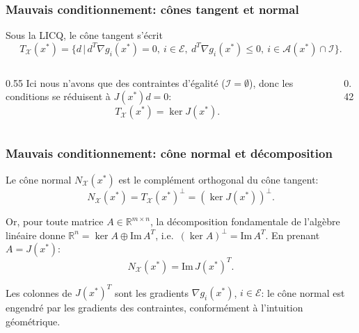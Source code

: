 \documentclass[t,usepdftitle=false,aspectratio=169]{beamer}
\def\cA{\mathcal{A}}
\def\cE{\mathcal{E}}
\def\cI{\mathcal{I}}
\def\cX{\mathcal{X}}
\def\RR{\mathbb{R}}
\begin{document}
\begin{frame}
\frametitle{Mauvais conditionnement: cônes tangent et normal}

Sous la LICQ, le cône tangent s'écrit
$$
T_{\cX}(x^*) = \{ d \,|\, d^T\nabla g_i(x^*) = 0,\ i \in \cE,\  d^T\nabla g_i(x^*) \leq 0,\ i \in \cA(x^*) \cap \cI \}.
$$

\begin{columns}[T]
\begin{column}{0.55\textwidth}
Ici nous n'avons que des contraintes d'égalité ($\cI = \emptyset$), donc les conditions se réduisent à $J(x^*)d = 0$:
$$
T_{\cX}(x^*) = \ker J(x^*).
$$
\end{column}
\begin{column}{0.42\textwidth}
\centering
{}
\end{column}
\end{columns}

\end{frame}

\begin{frame}
\frametitle{Mauvais conditionnement: cône normal et décomposition}

Le cône normal $N_{\cX}(x^*)$ est le complément orthogonal du cône tangent:
$$
N_{\cX}(x^*) = T_{\cX}(x^*)^\perp = (\ker J(x^*))^\perp.
$$

Or, pour toute matrice $A \in \RR^{m \times n}$, la décomposition fondamentale de l'algèbre linéaire donne $\RR^n = \ker A \oplus \mathrm{Im}\,A^T$, i.e.\ $(\ker A)^\perp = \mathrm{Im}\,A^T$. En prenant $A = J(x^*)$:
$$
N_{\cX}(x^*) = \mathrm{Im}\,J(x^*)^T.
$$

\mbox{}

Les colonnes de $J(x^*)^T$ sont les gradients $\nabla g_i(x^*)$, $i \in \cE$: le cône normal est engendré par les gradients des contraintes, conformément à l'intuition géométrique.

\end{frame}
\end{document}
